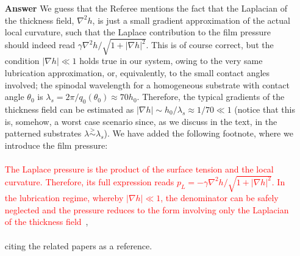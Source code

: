 \documentclass[12pt,english]{article}
\begin{document}
\begin{itemize}
\item[ \textbf{{Answer}}]
{
We guess that the Referee mentions the fact that the Laplacian of the thickness field, $\nabla^2 h$,
is just a small gradient approximation of the actual local curvature, such that the Laplace contribution to the film pressure should indeed read $\gamma \nabla^2 h/\sqrt{1+|\nabla h|^2}$. This is of course correct, but 
the condition $|\nabla h| \ll 1$ holds true in our system, owing to the very same lubrication approximation,
or, equivalently, to the small contact angles involved; the spinodal wavelength for a homogeneous substrate with
contact angle $\theta_0$ is $\lambda_s = 2\pi/q_0(\theta_0) \approx 70 h_0$. Therefore, the typical gradients
of the thickness field can be estimated as $|\nabla h| \sim h_0/\lambda_s \approx 1/70 \ll 1$ (notice 
that this is, somehow, a worst case scenario since, as we discuss in the text, in the patterned substrates
$\lambda \stackrel{>}{\sim} \lambda_s$).
We have added the following footnote, where we introduce the film pressure:\\
\\
\textcolor{red}{The Laplace pressure is the product of the surface tension 
and the local curvature. Therefore, its full expression reads $p_L = -\gamma \nabla^2 h/\sqrt{1+|\nabla h|^2}$. 
In the lubrication regime, whereby $|\nabla h| \ll 1$, the denominator can be safely neglected 
and the pressure reduces to the form involving only the Laplacian of the thickness 
field}~\cite{Benet2014,juanes2018}, \\
\\
citing the related papers as a reference.
}
\end{itemize}




\end{document}

